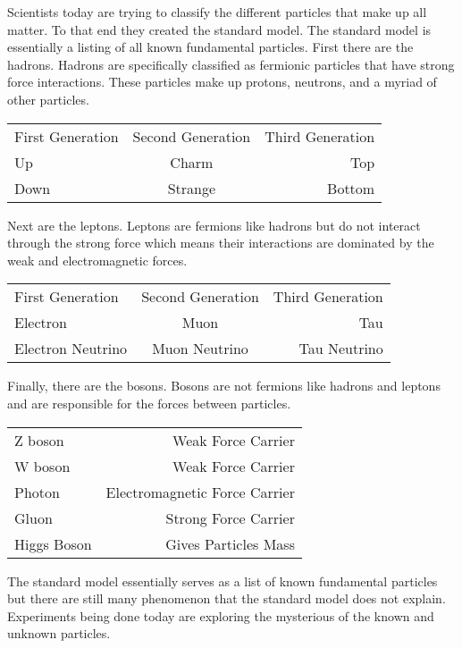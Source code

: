 \documentclass
[]
{thesis}
\begin{document}
Scientists today are trying to classify the different particles that make up all matter. To that end they created the standard model. The standard model is essentially a listing of all known fundamental particles. First there are the hadrons. Hadrons are specifically classified as fermionic particles that have strong force interactions. These particles make up protons, neutrons, and a myriad of other particles.
\\
\begin{center}
\begin{tabular}{l c r}
	First Generation & Second Generation & Third Generation \\
	Up & Charm & Top \\
	Down & Strange & Bottom \\
\end{tabular}
\end{center}
Next are the leptons. Leptons are fermions like hadrons but do not interact through the strong force which means their interactions are dominated by the weak and electromagnetic forces.
\\
\begin{center}
\begin{tabular}{l c r}
	First Generation & Second Generation & Third Generation \\
	Electron & Muon & Tau \\
	Electron Neutrino & Muon Neutrino & Tau Neutrino \\
\end{tabular}
\end{center}
Finally, there are the bosons. Bosons are not fermions like hadrons and leptons and are responsible for the forces between particles.
\\
\begin{center}
\begin{tabular}{l r}
	Z boson & Weak Force Carrier \\
	W boson & Weak Force Carrier \\
	Photon & Electromagnetic Force Carrier \\
	Gluon & Strong Force Carrier \\
	Higgs Boson & Gives Particles Mass \\
\end{tabular}
\end{center}
The standard model essentially serves as a list of known fundamental particles but there are still many phenomenon that the standard model does not explain. Experiments being done today are exploring the mysterious of the known and unknown particles. 
\end{document}
